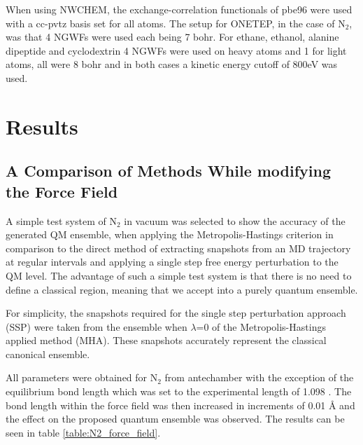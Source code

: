 When using NWCHEM, the exchange-correlation functionals of pbe96 were used with a cc-pvtz basis set for all atoms.  The setup for ONETEP, in the case of N$_2$, was that 4 NGWFs were used each being 7 bohr.  For ethane, ethanol, alanine dipeptide and cyclodextrin 4 NGWFs were used on heavy atoms and 1 for light atoms, all were 8 bohr and in both cases a kinetic energy cutoff of 800eV was used.

\section{Results}

\subsection{A Comparison of Methods While modifying the Force Field} \label{sec:N2_modification1}

A simple test system of N$_2$ in vacuum was selected to show the accuracy of the generated QM ensemble, when applying the Metropolis-Hastings criterion in comparison to the direct method of extracting snapshots from an MD trajectory at regular intervals and applying a single step free energy perturbation to the QM level.  The advantage of such a simple test system is that there is no need to define a classical region, meaning that we accept into a purely quantum ensemble.

For simplicity, the snapshots required for the single step perturbation approach (SSP) were taken from the ensemble when $\lambda$=0 of the Metropolis-Hastings applied method (MHA).  These snapshots accurately represent the classical canonical ensemble.

All parameters were obtained for N$_2$ from antechamber \cite{antechamber} with the exception of the equilibrium bond length which was set to the experimental length of 1.098 \cite{nist}.  The bond length within the force field was then increased in increments of 0.01 \AA{} and the effect on the proposed quantum ensemble was observed.  The results can be seen in table \ref{table:N2_force_field}.

